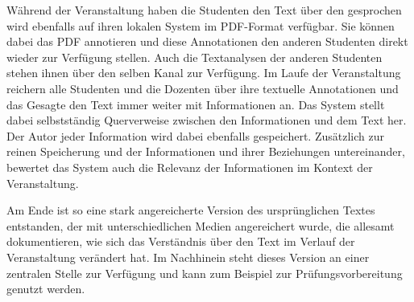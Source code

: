 \begin{framed}
  Während der Veranstaltung haben die Studenten den Text über den gesprochen wird ebenfalls auf ihren lokalen System im PDF-Format verfügbar. Sie können dabei das PDF annotieren und diese Annotationen den anderen Studenten direkt wieder zur Verfügung stellen. Auch die Textanalysen der anderen Studenten stehen ihnen über den selben Kanal zur Verfügung. Im Laufe der Veranstaltung reichern alle Studenten und die Dozenten über ihre textuelle Annotationen und das Gesagte den Text immer weiter mit Informationen an. Das System stellt dabei selbstständig Querverweise zwischen den Informationen und dem Text her. Der Autor jeder Information wird dabei ebenfalls gespeichert. Zusätzlich zur reinen Speicherung und der Informationen und ihrer Beziehungen untereinander, bewertet das System auch die Relevanz der Informationen im Kontext der Veranstaltung.

  Am Ende ist so eine stark angereicherte Version des ursprünglichen Textes entstanden, der mit unterschiedlichen Medien angereichert wurde, die allesamt dokumentieren, wie sich das Verständnis über den Text im Verlauf der Veranstaltung verändert hat. Im Nachhinein steht dieses Version an einer zentralen Stelle zur Verfügung und kann zum Beispiel zur Prüfungsvorbereitung genutzt werden.

\end{framed}
 
